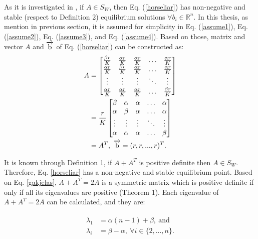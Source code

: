 As it is investigated in \cite{Takeuchi1980}, if $A \in S_W$, then Eq. (\ref{horseliar}) has non-negative and stable (respect to Definition 2) equilibrium solutions $\forall b_i \in \mathbb{R}^n$. In this thesis, as mention in previous section, it is assumed for simplicity in Eq. (\ref{assume1}), Eq. (\ref{assume2}), Eq. (\ref{assume3}), and Eq. (\ref{assume4}). Based on those, matrix and vector $A$ and $\overrightarrow{\rm b}$ of Eq. (\ref{horseliar}) can be constructed as:
\begin{align}
	\begin{split}
		\label{gakjelas}
		A &= \begin{bmatrix}
			\frac{\beta r}{K} & \frac{\alpha r}{K} & \frac{\alpha r}{K} & \dots  & \frac{\alpha r}{K} \\
			\frac{\alpha r}{K} & \frac{\beta r}{K} & \frac{\alpha r}{K} & \dots  & \frac{\alpha r}{K} \\
			\vdots & \vdots & \vdots & \ddots & \vdots \\
			\frac{\alpha r}{K} & \frac{\alpha r}{K} & \frac{\alpha r}{K} & \dots  & \frac{\beta r}{K} 
		\end{bmatrix} \\ &= \frac{r}{K} \begin{bmatrix}
			\beta  & \alpha & \alpha & \dots  & \alpha \\
			\alpha & \beta & \alpha & \dots  & \alpha \\
			\vdots & \vdots & \vdots & \ddots & \vdots \\
			\alpha & \alpha & \alpha & \dots  & \beta  
		\end{bmatrix} \\
		&= A^T,~\overrightarrow{\rm b}=(r, r, ..., r)^T.
	\end{split}
\end{align}

It is known through Definition 1, if $A+A^T$ is positive definite then $A\in S_W$. Therefore, Eq. \ref{horseliar} has a non-negative and stable equilibrium point. Based on Eq. \ref{gakjelas}, $A+A^T=2A$ is a symmetric matrix which is positive definite if only if all its eigenvalues are positive (Theorem 1). Each eigenvalue of $A+A^T=2A$ can be calculated, and they are: 

\begin{align}
	\begin{split}
		\label{eigen}
		\lambda_1 &= \alpha(n-1)+\beta,~\text{and} \\ \lambda_i &= \beta - \alpha,~\forall i \in \{2, ..., n\}.
	\end{split}
\end{align}

